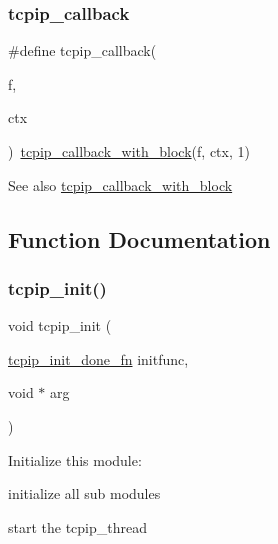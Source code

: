 \subsubsection{\texorpdfstring{tcpip\+\_\+callback}{tcpip\_callback}\hspace{0.1cm}{\footnotesize\ttfamily [2/2]}}
{\footnotesize\ttfamily \#define tcpip\+\_\+callback(\begin{DoxyParamCaption}\item[{}]{f,  }\item[{}]{ctx }\end{DoxyParamCaption})~\hyperlink{openmote-cc2538_2lwip_2src_2include_2lwip_2tcpip_8h_ab1d3ef23817d7703fa75ed67bd45ea1d}{tcpip\+\_\+callback\+\_\+with\+\_\+block}(f, ctx, 1)}

\begin{DoxySeeAlso}{See also}
\hyperlink{native_2lwip_2src_2include_2lwip_2tcpip_8h_ab1d3ef23817d7703fa75ed67bd45ea1d}{tcpip\+\_\+callback\+\_\+with\+\_\+block} 
\end{DoxySeeAlso}


\subsection{Function Documentation}
\mbox{\label{group__lwip__os_ga1f3a88b8df6ba3b9ed1c00e0a305e3db}} 
\subsubsection{\texorpdfstring{tcpip\+\_\+init()}{tcpip\_init()}}
{\footnotesize\ttfamily void tcpip\+\_\+init (\begin{DoxyParamCaption}\item[{\hyperlink{openmote-cc2538_2lwip_2src_2include_2lwip_2tcpip_8h_a5fe07216c441e27c3028bcac60fa0992}{tcpip\+\_\+init\+\_\+done\+\_\+fn}}]{initfunc,  }\item[{void $\ast$}]{arg }\end{DoxyParamCaption})}

Initialize this module\+:
\begin{DoxyItemize}
\item initialize all sub modules
\item start the tcpip\+\_\+thread
\end{DoxyItemize}



